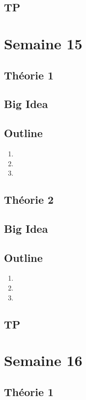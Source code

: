 \documentclass{article}
\begin{document}
\subsection{TP}

\pagebreak
\section{Semaine 15}
\subsection{Théorie 1}
\subsection*{Big Idea}
\subsection*{Outline}
\begin{enumerate}
    \item
    \item
    \item
\end{enumerate}
\subsection{Théorie 2}
\subsection*{Big Idea}
\subsection*{Outline}
\begin{enumerate}
    \item
    \item
    \item
\end{enumerate}
\subsection{TP}

\pagebreak
\section{Semaine 16}
\subsection{Théorie 1}
\end{document}
